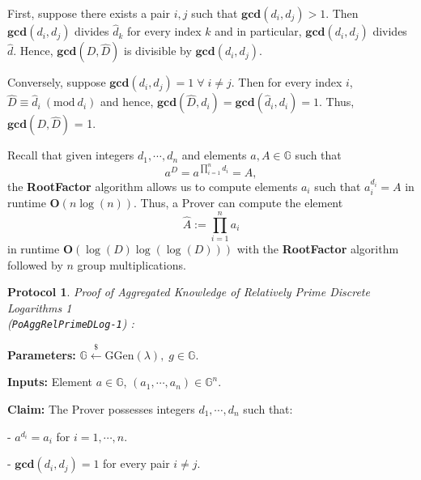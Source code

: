 \documentclass[11pt, lettersize, notitlepage, leqno, footskip=0.6cm]{article}
\newcommand{\pl}{\prod\limits}
\newcommand{\mb}{\mathbb}
\newcommand{\mbf}{\mathbf}
\newcommand{\mr}{\mathrm}
\newcommand{\lamb}{\lambda}
\newcommand{\what}{\widehat}
\newcommand{\vs}{\vspace{-0.15cm}}
\newcommand{\noin}{\noindent}
\newcommand{\Mod}[1]{\ (\mathrm{mod}\ #1)}
\newcommand{\GCD}{\mbf{gcd}}
\newtheorem{Prot}[Thm]{Protocol}
\numberwithin{equation}{section}
\begin{document}
\begin{prf} First, suppose there exists a pair $i,j$ such that $\GCD(d_i,d_j)> 1$. Then $\GCD(d_i,d_j)$ divides $\what{d}_k$ for every index $k$ and in particular, $\GCD(d_i,d_j)$ divides $\what{d}$. Hence, $\GCD(D,\what{D})$ is divisible by $\GCD(d_i,d_j)$.

Conversely, suppose $\GCD(d_i,d_j)=1\;\forall\;i\neq j$. Then for every index $i$, $\what{D}\equiv \what{d}_i\Mod{d_i} $ and hence, $\GCD(\what{D}, d_i) = \GCD(\what{d}_i, d_i) = 1$. Thus, $\GCD(D,\what{D})$ = 1.\end{prf}

\noin Recall that given integers $d_1,\cdots,d_n$ and elements $a,A\in\mb{G}$ such that \vs $$a^D = a^{\pl_{i=1}^n d_i} = A ,$$ the \textbf{RootFactor} algorithm allows us to compute elements $a_i$ such that $a_i^{d_i} = A$ in runtime $\mbf{O}(n\log(n))$. Thus, a Prover can compute the element \vs $$\what{A}:= \pl_{i=1}^n a_i$$ in runtime $\mbf{O}(\log(D)\log(\log(D)))$ with the \textbf{RootFactor} algorithm followed by $n$ group multiplications.

\vspace{0.2cm}

\begin{Prot} \normalfont \textit{Proof of Aggregated Knowledge of Relatively Prime Discrete Logarithms} 1 \\(\verb|PoAggRelPrimeDLog-1|) :\end{Prot} \vspace{-0.3cm}

\noindent \textbf{Parameters:} $\mb{G}\xleftarrow{\$} \mr{GGen}(\lamb), \; g\in \mb{G}$.

\noindent \textbf{Inputs:} Element $a\in\mb{G}$, $(a_1,\cdots,a_n)\in \mb{G}^n$.

\noindent \textbf{Claim:} The Prover possesses integers $d_1,\cdots, d_n$ such that:

\noindent - $a^{d_i} = a_i$ for $i = 1,\cdots, n$.

\noindent - $\GCD(d_i, d_j) = 1$ for every pair $i\neq j$.
\end{document}

